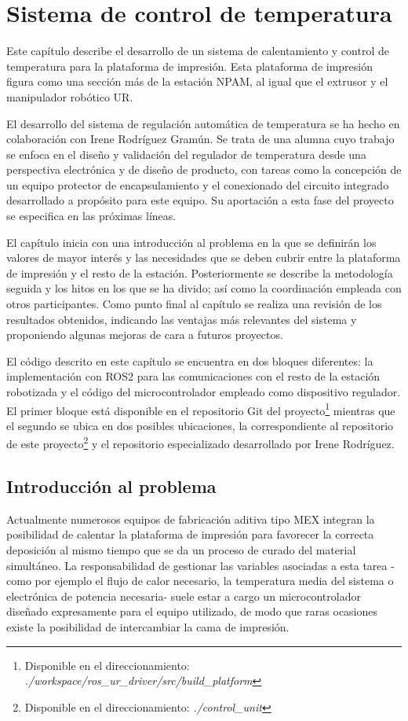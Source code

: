 \chapter{Sistema de control de temperatura}
\label{cap: control_temperatura}

Este capítulo describe el desarrollo de un sistema de calentamiento y control de temperatura para la plataforma de impresión. Esta plataforma de impresión figura como una sección más de la estación \acrshort{NPAM}, al igual que el extrusor y el manipulador robótico UR. 

El desarrollo del sistema de regulación automática de temperatura se ha hecho en colaboración con Irene Rodríguez Gramún. Se trata de una alumna cuyo trabajo se enfoca en el diseño y validación del regulador de temperatura desde una perspectiva electrónica y de diseño de producto, con tareas como  la concepción de un equipo protector de encapsulamiento y el conexionado del circuito integrado desarrollado a propósito para este equipo. Su aportación a esta fase del proyecto se especifica en las próximas líneas.

El capítulo inicia con una introducción al problema en la que se definirán los valores de mayor interés y las necesidades que se deben cubrir entre la plataforma de impresión y el resto de la estación. Posteriormente se describe la metodología seguida y los hitos en los que se ha divido; así como la coordinación empleada con otros participantes. Como punto final al capítulo se realiza una revisión de los resultados obtenidos, indicando las ventajas más relevantes del sistema y proponiendo algunas mejoras de cara a futuros proyectos.

El código descrito en este capítulo se encuentra en dos bloques diferentes: la implementación con ROS2 para las comunicaciones con el resto de la estación robotizada y el código del microcontrolador empleado como dispositivo regulador. El primer bloque está disponible en el repositorio Git del proyecto\footnote{Disponible en el direccionamiento: \textit{./workspace/ros\_ur\_driver/src/build\_platform}}\cite{repo_github_TFM_MiguelLerinAlonso} mientras que el segundo se ubica en dos posibles ubicaciones, la correspondiente al repositorio de este proyecto\footnote{Disponible en el direccionamiento: \textit{./control\_unit}}  y el repositorio especializado desarrollado por Irene Rodríguez\cite{repo_github_Irene_Rodriguez}.

\section{Introducción al problema}
Actualmente numerosos equipos de fabricación aditiva tipo \acrshort{MEX} integran la posibilidad de calentar la plataforma de impresión para favorecer la correcta deposición al mismo tiempo que se da un proceso de curado del material simultáneo. La responsabilidad de gestionar las variables asociadas a esta tarea -como por ejemplo el flujo de calor necesario, la temperatura media del sistema o electrónica de potencia necesaria- suele estar a cargo un microcontrolador diseñado expresamente para el equipo utilizado, de modo que raras ocasiones existe la posibilidad de intercambiar la cama de impresión.

